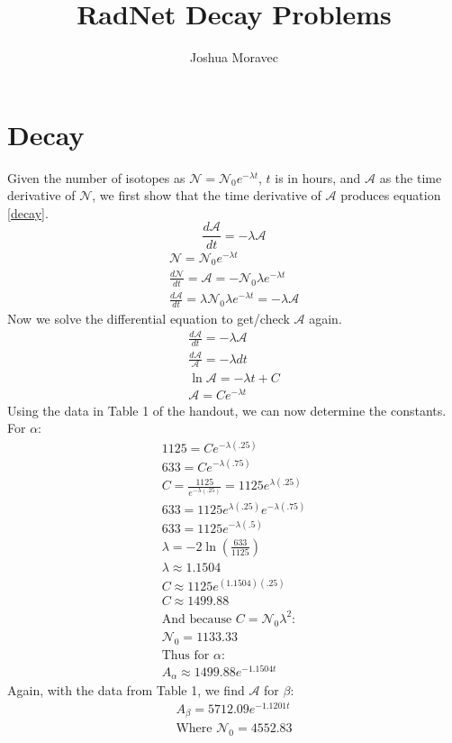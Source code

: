 \documentclass[11pt]{article}
\title{RadNet Decay Problems}
\author{Joshua Moravec}
\makeatletter
\renewcommand{\maketitle} %
{ \begingroup \vskip 10pt \begin{center} \large {\bf \@title}
	\vskip 10pt \large \@author \hskip 20pt \@date \end{center}
  \vskip 10pt \endgroup \setcounter{footnote}{0} }
\renewcommand{\d}[2]{\frac{d #1}{d #2}} %
\renewcommand{\=}[1]{\stackrel{#1}{=}} %
\theoremstyle{definition}
\theoremstyle{remark}
\makeatother
\begin{document}
\maketitle
\section{Decay}
Given the number of isotopes as $\mathcal{N} = \mathcal{N}_0 {e}^{-\lambda t}$, $t$ is in hours, and $\mathcal{A}$ as the time derivative of $\mathcal{N}$, we first show that the time derivative of $\mathcal{A}$ produces equation \ref{decay}.
\begin{equation} \label{decay}
\d{\mathcal{A}}{t} = -\lambda \mathcal{A}
\end{equation}
\begin{gather}
\mathcal{N} = \mathcal{N}_0 {e}^{-\lambda t} \\
\d{\mathcal{N}}{t} = \mathcal{A} = -\mathcal{N}_0\lambda{e}^{-\lambda t} \\
\d{\mathcal{A}}{t} = \lambda\mathcal{N}_0\lambda{e}^{-\lambda t} = -\lambda \mathcal{A}
\end{gather}
Now we solve the differential equation to get/check $\mathcal{A}$ again.
\begin{gather}
\d{\mathcal{A}}{t} = -\lambda\mathcal{A} \\
\frac{d\mathcal{A}}{\mathcal{A}} = -\lambda dt \\
\ln \mathcal{A} = -\lambda t + C \\
\mathcal{A} = C{e}^{-\lambda t}
\end{gather}
Using the data in Table 1 of the handout, we can now determine the constants. For $\alpha$:
\begin{gather}
1125 = C{e}^{-\lambda(.25)} \\
633 = Ce^{-\lambda(.75)} \\
C = \frac{1125}{e^{-\lambda(.25)}} = 1125e^{\lambda(.25)}\\
633 = 1125e^{\lambda(.25)}e^{-\lambda(.75)} \\
633 = 1125e^{-\lambda(.5)} \\
\lambda = -2\ln\left(\frac{633}{1125}\right) \\
\lambda \approx 1.1504 \\
C \approx 1125e^{(1.1504)(.25)} \\
C \approx 1499.88 \\
\text{And because } C = \mathcal{N}_0\lambda^2 \text{:} \\
\mathcal{N}_0 = 1133.33 \\
\text{Thus for }\alpha\text{:} \\
A_\alpha \approx 1499.88 e^{-1.1504 t}
\end{gather}
Again, with the data from Table 1, we find $\mathcal{A}$ for $\beta$:
\begin{gather}
A_\beta = 5712.09e^{-1.1201 t} \\
\text{Where }\mathcal{N}_0 = 4552.83
\end{gather}
\end{document}
